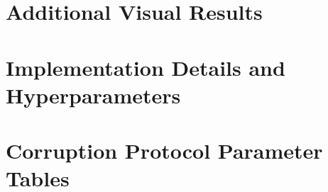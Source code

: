 \chapter{Additional Visual Results}
\label{app:visuals}


\chapter{Implementation Details and Hyperparameters}
\label{app:implementation}


\chapter{Corruption Protocol Parameter Tables}
\label{app:protocol_params}


